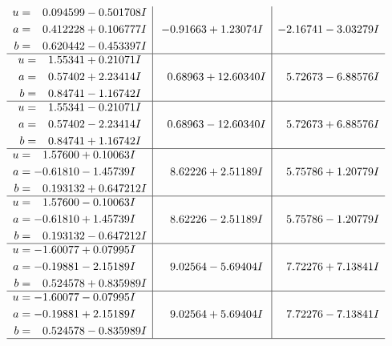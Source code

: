 \documentclass[1p]{elsarticle_modified}
\theoremstyle{definition}
\begin{document}
$$\begin{array}{c|c|c}
\begin{aligned}
u &= \phantom{-}0.094599 - 0.501708 I \\
a &= \phantom{-}0.412228 + 0.106777 I \\
b &= \phantom{-}0.620442 - 0.453397 I\end{aligned}
 & -0.91663 + 1.23074 I & -2.16741 - 3.03279 I \\ \hline\begin{aligned}
u &= \phantom{-}1.55341 + 0.21071 I \\
a &= \phantom{-}0.57402 + 2.23414 I \\
b &= \phantom{-}0.84741 - 1.16742 I\end{aligned}
 & \phantom{-}0.68963 + 12.60340 I & \phantom{-}5.72673 - 6.88576 I \\ \hline\begin{aligned}
u &= \phantom{-}1.55341 - 0.21071 I \\
a &= \phantom{-}0.57402 - 2.23414 I \\
b &= \phantom{-}0.84741 + 1.16742 I\end{aligned}
 & \phantom{-}0.68963 - 12.60340 I & \phantom{-}5.72673 + 6.88576 I \\ \hline\begin{aligned}
u &= \phantom{-}1.57600 + 0.10063 I \\
a &= -0.61810 - 1.45739 I \\
b &= \phantom{-}0.193132 + 0.647212 I\end{aligned}
 & \phantom{-}8.62226 + 2.51189 I & \phantom{-}5.75786 + 1.20779 I \\ \hline\begin{aligned}
u &= \phantom{-}1.57600 - 0.10063 I \\
a &= -0.61810 + 1.45739 I \\
b &= \phantom{-}0.193132 - 0.647212 I\end{aligned}
 & \phantom{-}8.62226 - 2.51189 I & \phantom{-}5.75786 - 1.20779 I \\ \hline\begin{aligned}
u &= -1.60077 + 0.07995 I \\
a &= -0.19881 - 2.15189 I \\
b &= \phantom{-}0.524578 + 0.835989 I\end{aligned}
 & \phantom{-}9.02564 - 5.69404 I & \phantom{-}7.72276 + 7.13841 I \\ \hline\begin{aligned}
u &= -1.60077 - 0.07995 I \\
a &= -0.19881 + 2.15189 I \\
b &= \phantom{-}0.524578 - 0.835989 I\end{aligned}
 & \phantom{-}9.02564 + 5.69404 I & \phantom{-}7.72276 - 7.13841 I\\
 \hline 
 \end{array}$$\newpage\newpage\renewcommand{\arraystretch}{1}
\end{document}
